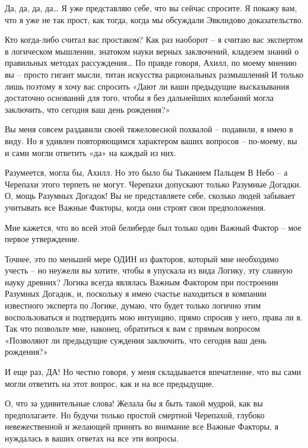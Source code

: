 \documentclass[../main.tex]{subfiles}
\begin{document}
\begin{dialogue}
 Да, да, да, да\ldots{} Я уже представляю себе, что вы сейчас спросите. Я покажу вам, что я уже не так прост, как тогда, когда мы обсуждали Эвклидово доказательство.

 Кто когда-либо считал вас простаком? Как раз наоборот \--- я считаю вас экспертом в логическом мышлении, знатоком науки верных заключений, кладезем знаний о правильных методах рассуждения\ldots{} По правде говоря, Ахилл, по моему мнению вы \--- просто гигант мысли, титан искусства рациональных размышлений И только лишь поэтому я хочу вас спросить «Дают ли ваши предыдущие высказывания достаточно оснований для того, чтобы я без дальнейших колебаний могла заключить, что сегодня ваш день рождения?»

 Вы меня совсем раздавили своей тяжеловесной похвалой \--- подавили, я имею в виду. Но я удивлен повторяющимся характером ваших вопросов \--- по-моему, вы и сами могли ответить «да» на каждый из них.

 Разумеется, могла бы, Ахилл. Но это было бы Тыканием Пальцем В Небо \--- а Черепахи этого терпеть не могут. Черепахи допускают только Разумные Догадки. О, мощь Разумных Догадок! Вы не представляете себе, сколько людей забывает учитывать все Важные Факторы, когда они строят свои предположения.

 Мне кажется, что во всей этой белиберде был только один Важный Фактор \--- мое первое утверждение.

 Точнее, это по меньшей мере ОДИН из факторов, который мне необходимо учесть \--- но неужели вы хотите, чтобы я упускала из вида Логику, эту славную науку древних? Логика всегда являлась Важным Фактором при построении Разумных Догадок, и, поскольку я имею счастье находиться в компании известного эксперта по Логике, думаю, что будет только логично этим воспользоваться и подтвердить мою интуицию, прямо спросив у него, права ли я. Так что позвольте мне, наконец, обратиться к вам с прямым вопросом «Позволяют ли предыдущие суждения заключить, что сегодня ваш день рождения?»

 И еще раз, ДА! Но честно говоря, у меня складывается впечатление, что вы сами могли ответить на этот вопрос, как и на все предыдущие.

 О, что за удивительные слова! Желала бы я быть такой мудрой, как вы предполагаете. Но будучи только простой смертной Черепахой, глубоко невежественной и желающей принять во внимание все Важные Факторы, я нуждалась в ваших ответах на все эти вопросы.


\end{dialogue}
\end{document}
